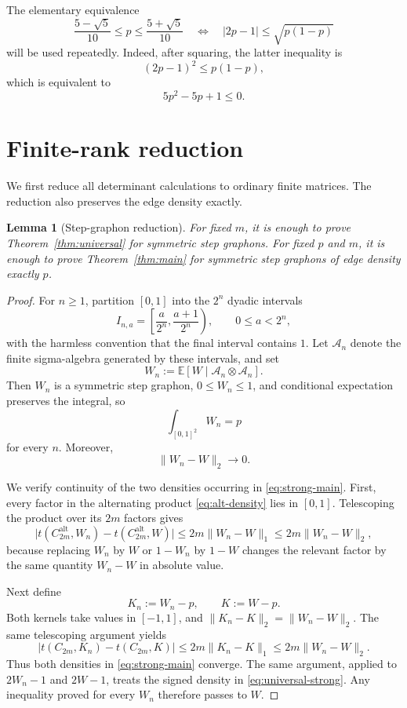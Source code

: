 \documentclass[11pt]{article}
\newtheorem{lemma}[theorem]{Lemma}
\newcommand{\Alt}{\mathrm{alt}}
\begin{document}
The elementary equivalence
\begin{equation}
 \frac{5-\sqrt5}{10}\le p\le \frac{5+\sqrt5}{10}
 \quad\Longleftrightarrow\quad
 |2p-1|\le\sqrt{p(1-p)}
 \label{eq:range-equivalence}
\end{equation}
will be used repeatedly.  Indeed, after squaring, the latter inequality is
\[
   (2p-1)^2\le p(1-p),
\]
which is equivalent to
\[
   5p^2-5p+1\le0.
\]

\section{Finite-rank reduction}

We first reduce all determinant calculations to ordinary finite matrices.  The reduction also preserves the edge density exactly.

\begin{lemma}[Step-graphon reduction]\label{lem:step-reduction}
For fixed $m$, it is enough to prove Theorem~\ref{thm:universal} for symmetric step graphons.  For
fixed $p$ and $m$, it is enough to prove Theorem~\ref{thm:main} for symmetric step graphons of edge
density exactly $p$.
\end{lemma}

\begin{proof}
For $n\ge1$, partition $[0,1]$ into the $2^n$ dyadic intervals
\[
   I_{n,a}=\left[\frac{a}{2^n},\frac{a+1}{2^n}\right),
   \qquad 0\le a<2^n,
\]
with the harmless convention that the final interval contains $1$.  Let $\mathcal A_n$ denote the finite sigma-algebra generated by these intervals, and set
\[
   W_n:=\mathbb E[W\mid\mathcal A_n\otimes\mathcal A_n].
\]
Then $W_n$ is a symmetric step graphon, $0\le W_n\le1$, and conditional expectation preserves the integral, so
\[
   \int_{[0,1]^2}W_n=p
\]
for every $n$.  Moreover,
\[
   \|W_n-W\|_2\longrightarrow0.
\]

We verify continuity of the two densities occurring in \eqref{eq:strong-main}.  First, every factor in the alternating product \eqref{eq:alt-density} lies in $[0,1]$.  Telescoping the product over its $2m$ factors gives
\[
   \bigl|t(C_{2m}^{\Alt},W_n)-t(C_{2m}^{\Alt},W)\bigr|
   \le 2m\|W_n-W\|_1
   \le 2m\|W_n-W\|_2,
\]
because replacing $W_n$ by $W$ or $1-W_n$ by $1-W$ changes the relevant factor by the same quantity $W_n-W$ in absolute value.

Next define
\[
   K_n:=W_n-p,
   \qquad
   K:=W-p.
\]
Both kernels take values in $[-1,1]$, and $\|K_n-K\|_2=\|W_n-W\|_2$.  The same telescoping argument yields
\[
   |t(C_{2m},K_n)-t(C_{2m},K)|
   \le 2m\|K_n-K\|_1
   \le 2m\|W_n-W\|_2.
\]
Thus both densities in \eqref{eq:strong-main} converge.  The same argument, applied to $2W_n-1$
and $2W-1$, treats the signed density in \eqref{eq:universal-strong}.  Any inequality proved for
every $W_n$ therefore passes to $W$.
\end{proof}
\end{document}
